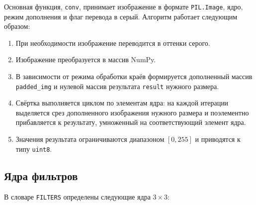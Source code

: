 \documentclass[a4paper]{article}
\begin{document}
Основная функция, \verb|conv|, принимает изображение в формате \verb|PIL.Image|, ядро, режим дополнения и флаг перевода в серый. Алгоритм работает следующим образом:

\begin{enumerate}
    \item При необходимости изображение переводится в оттенки серого.
    \item Изображение преобразуется в массив NumPy.
    \item В зависимости от режима обработки краёв формируется дополненный массив \verb|padded_img| и нулевой массив результата \verb|result| нужного размера.
    \item Свёртка выполняется циклом по элементам ядра: на каждой итерации выделяется срез дополненного изображения нужного размера и поэлементно прибавляется к результату, умноженный на соответствующий элемент ядра.
    \item Значения результата ограничиваются диапазоном $[0, 255]$ и приводятся к типу \verb|uint8|.
\end{enumerate}

\subsection{Ядра фильтров}

В словаре \verb|FILTERS| определены следующие ядра $3 \times 3$:
\end{document}
